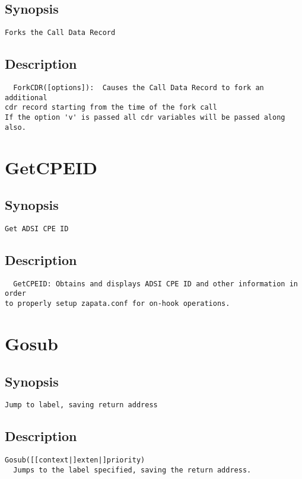 \subsection{Synopsis}
\begin{verbatim}
Forks the Call Data Record
\end{verbatim}
\subsection{Description}
\begin{verbatim}
  ForkCDR([options]):  Causes the Call Data Record to fork an additional
cdr record starting from the time of the fork call
If the option 'v' is passed all cdr variables will be passed along also.

\end{verbatim}


\section{GetCPEID}
\subsection{Synopsis}
\begin{verbatim}
Get ADSI CPE ID
\end{verbatim}
\subsection{Description}
\begin{verbatim}
  GetCPEID: Obtains and displays ADSI CPE ID and other information in order
to properly setup zapata.conf for on-hook operations.

\end{verbatim}


\section{Gosub}
\subsection{Synopsis}
\begin{verbatim}
Jump to label, saving return address
\end{verbatim}
\subsection{Description}
\begin{verbatim}
Gosub([[context|]exten|]priority)
  Jumps to the label specified, saving the return address.

\end{verbatim}


